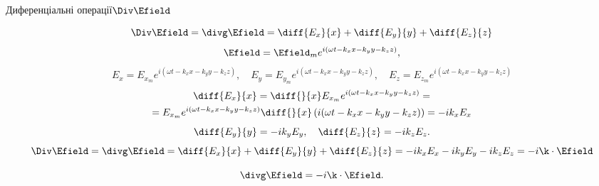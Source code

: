 \documentclass{beamer}
\begin{document}
\begin{frame}{Диференціальні операції}{$\Div\Efield$}
\begin{block}{}
\begin{equation*}
    \Div\Efield = \divg\Efield =  \diff{E_x}{x} + \diff{E_y}{y} + \diff{E_z}{z}
\end{equation*}
\begin{equation*}
    \Efield = \Efield_me^{i(\omega t - k_xx - k_yy - k_zz)},
\end{equation*}
\begin{equation*}
    E_x = E_{x_m}e^{i(\omega t - k_xx - k_yy - k_zz)}, \quad
    E_y = E_{y_m}e^{i(\omega t - k_xx - k_yy - k_zz)}, \quad
    E_z = E_{z_m}e^{i(\omega t - k_xx - k_yy - k_zz)}
\end{equation*}
\begin{multline*}
    \diff{E_x}{x} = \diff{}{x} E_{x_m}e^{i(\omega t - k_xx - k_yy - k_zz)} = \\ = E_{x_m} e^{i(\omega t - k_xx - k_yy - k_zz)}  \diff{}{x}\left(
    i(\omega t -
    k_xx - k_yy - k_zz) \right) =
    -i k_xE_x
\end{multline*}
\begin{equation*}
    \diff{E_y}{y} = -i k_yE_y, \quad  \diff{E_z}{z} = -i k_zE_z.
\end{equation*}
\begin{equation*}
    \Div\Efield = \divg\Efield =  \diff{E_x}{x} + \diff{E_y}{y} + \diff{E_z}{z} = -ik_xE_x - ik_yE_y - i k_zE_z = -i\k\cdot\Efield
\end{equation*}
\end{block}
\begin{block}{}
    \begin{equation*}
    \divg\Efield = -i\k\cdot\Efield.
\end{equation*}
\end{block}
\end{frame}
\end{document}
